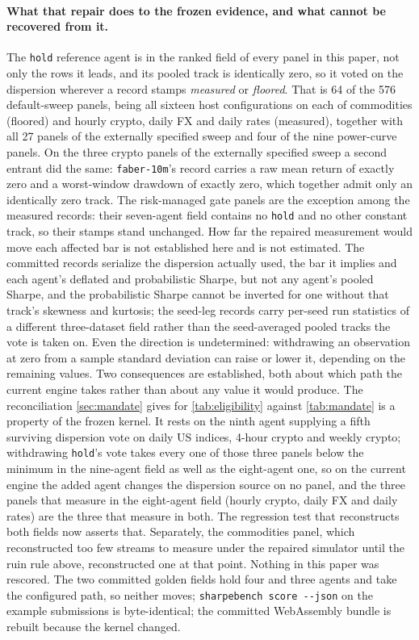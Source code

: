 \paragraph{What that repair does to the frozen evidence, and what cannot be recovered from it.} The \texttt{hold} reference agent is in the ranked field of every panel in this paper, not only the rows it leads, and its pooled track is identically zero, so it voted on the dispersion wherever a record stamps \emph{measured} or \emph{floored}. That is 64 of the 576 default-sweep panels, being all sixteen host configurations on each of commodities (floored) and hourly crypto, daily FX and daily rates (measured), together with all 27 panels of the externally specified sweep and four of the nine power-curve panels. On the three crypto panels of the externally specified sweep a second entrant did the same: \texttt{faber-10m}'s record carries a raw mean return of exactly zero and a worst-window drawdown of exactly zero, which together admit only an identically zero track. The risk-managed gate panels are the exception among the measured records: their seven-agent field contains no \texttt{hold} and no other constant track, so their stamps stand unchanged. How far the repaired measurement would move each affected bar is not established here and is not estimated. The committed records serialize the dispersion actually used, the bar it implies and each agent's deflated and probabilistic Sharpe, but not any agent's pooled Sharpe, and the probabilistic Sharpe cannot be inverted for one without that track's skewness and kurtosis; the seed-leg records carry per-seed run statistics of a different three-dataset field rather than the seed-averaged pooled tracks the vote is taken on. Even the direction is undetermined: withdrawing an observation at zero from a sample standard deviation can raise or lower it, depending on the remaining values. Two consequences are established, both about which path the current engine takes rather than about any value it would produce. The reconciliation \cref{sec:mandate} gives for \cref{tab:eligibility} against \cref{tab:mandate} is a property of the frozen kernel. It rests on the ninth agent supplying a fifth surviving dispersion vote on daily US indices, 4-hour crypto and weekly crypto; withdrawing \texttt{hold}'s vote takes every one of those three panels below the minimum in the nine-agent field as well as the eight-agent one, so on the current engine the added agent changes the dispersion source on no panel, and the three panels that measure in the eight-agent field (hourly crypto, daily FX and daily rates) are the three that measure in both. The regression test that reconstructs both fields now asserts that. Separately, the commodities panel, which reconstructed too few streams to measure under the repaired simulator until the ruin rule above, reconstructed one at that point. Nothing in this paper was rescored. The two committed golden fields hold four and three agents and take the configured path, so neither moves; \texttt{sharpebench score -{}-json} on the example submissions is byte-identical; the committed WebAssembly bundle is rebuilt because the kernel changed.

